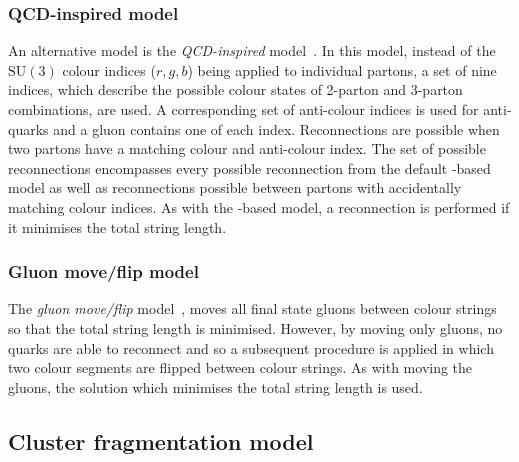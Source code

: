 \subsubsection{QCD-inspired model} %
\label{sub:qcd_inspired_model}

An alternative \CR{} model is the \textit{QCD-inspired} model~\cite{Gen:QCDBased}.
In this model, instead of the $\mathrm{SU(3)}$ colour indices ($r,g,b$) being applied to individual partons, a set of nine indices, which describe the possible colour states of 2-parton and 3-parton combinations, are used.
A corresponding set of anti-colour indices is used for anti-quarks and a gluon contains one of each index.
Reconnections are possible when two partons have a matching colour and anti-colour index.
The set of possible reconnections encompasses every possible reconnection from the default \MPI-based \CR{} model as well as reconnections possible between partons with accidentally matching colour indices.
As with the \MPI-based \CR{} model, a reconnection is performed if it minimises the total \QCD{} string length.

\subsubsection{Gluon move/flip model} %
\label{sub:gluon_move_flip_model}

The \textit{gluon move/flip} model~\cite{Gen:GluonMove}, moves all final state gluons between colour strings so that the total string length is minimised. 
However, by moving only gluons, no quarks are able to reconnect and so a subsequent procedure is applied in which two colour segments are flipped between colour strings.
As with moving the gluons, the solution which minimises the total string length is used.


\subsection{Cluster fragmentation model} %
\label{sub:cluster_fragmentation}

